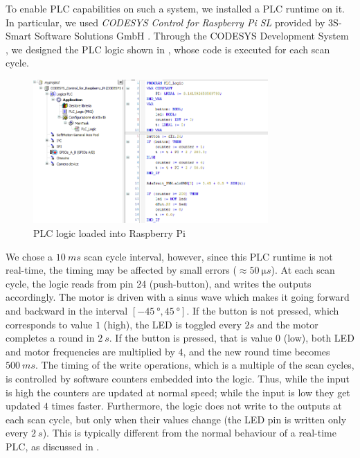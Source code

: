 To enable PLC capabilities on such a system, we installed a PLC runtime on it. In particular, we used \emph{CODESYS Control for Raspberry Pi SL}
provided by 3S-Smart Software Solutions GmbH \cite{codesys_runtime}. Through the CODESYS Development System \cite{codesys_dev},
we designed the PLC logic shown in , whose code is executed for each scan cycle.
\begin{figure}[h]
\centerline{\includegraphics[width=0.8\textwidth]{res/pi_logic}}
\caption{PLC logic loaded into Raspberry Pi \label{fig:pi_logic}}
\end{figure}
We chose a $\SI{10}{ms}$ scan cycle interval, however, since this PLC runtime is not real-time, the timing may be affected by small errors ($\approx \SI{50}{\micro s}$). 
At each scan cycle, the logic reads from pin 24 (push-button), and writes the outputs accordingly.
The motor is driven with a sinus wave which makes it going forward and backward in the interval $[\SI{-45}{\degree}, \SI{+45}{\degree}]$.
If the button is not pressed, which corresponds to value $1$ (high), the LED is toggled every $2s$ and the motor completes a round in $\SI{2}{s}$.
If the button is pressed, that is value $0$ (low), both LED and motor frequencies are multiplied by $4$, and the new round time becomes $\SI{500}{ms}$.
The timing of the write operations, which is a multiple of the scan cycles, is controlled by software counters embedded into the logic.
Thus, while the input is high the counters are updated at normal speed; while the input is low they get updated $4$ times faster.
Furthermore, the logic does not write to the outputs at each scan cycle, but only when their values change (\eg the LED pin is written only every $\SI{2}{s}$).
This is typically different from the normal behaviour of a real-time PLC, as discussed in .

